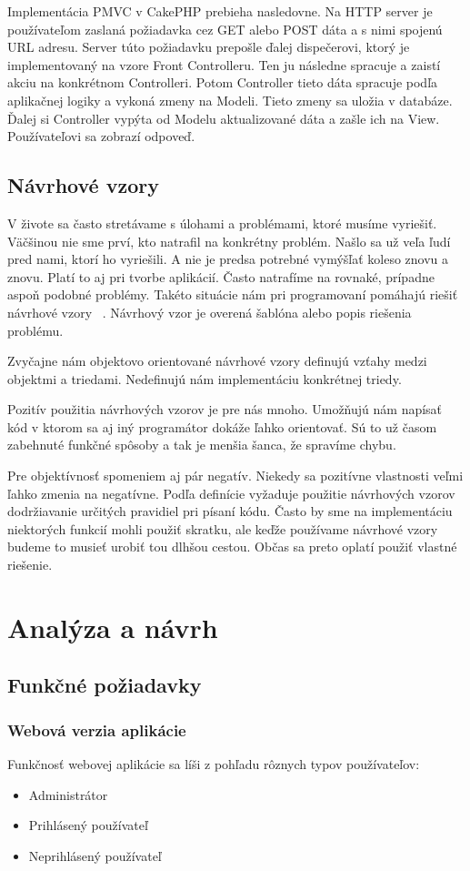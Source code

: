 \documentclass[12pt]{book}
\begin{document}
Implementácia PMVC v CakePHP prebieha nasledovne. Na HTTP server je používateľom zaslaná požiadavka cez GET alebo POST dáta a s nimi spojenú URL adresu. Server túto požiadavku prepošle ďalej dispečerovi, ktorý je implementovaný na vzore Front Controlleru. Ten ju následne spracuje a zaistí akciu na konkrétnom Controlleri. Potom Controller tieto dáta spracuje podľa aplikačnej logiky a vykoná zmeny na Modeli. Tieto zmeny sa uložia v databáze. Ďalej si Controller vypýta od Modelu aktualizované dáta a zašle ich na View. Používateľovi sa zobrazí odpoveď.
 

\section{Návrhové vzory}
V živote sa často stretávame s úlohami a problémami, ktoré musíme vyriešiť. Väčšinou nie sme prví, kto natrafil na konkrétny problém. Našlo sa už veľa ľudí pred nami, ktorí ho vyriešili. A nie je predsa potrebné vymýšľať koleso znovu a znovu. Platí to aj pri tvorbe aplikácií.  Často natrafíme na rovnaké, prípadne aspoň podobné problémy. Takéto situácie nám pri programovaní pomáhajú riešiť návrhové vzory \cite{NavrhoveVzory}\ . Návrhový vzor je overená šablóna alebo popis riešenia problému.

Zvyčajne nám objektovo orientované návrhové vzory definujú vzťahy medzi objektmi a triedami. Nedefinujú nám implementáciu konkrétnej triedy.  

Pozitív použitia návrhových vzorov je pre nás mnoho. Umožňujú nám napísať kód v ktorom sa aj iný programátor dokáže ľahko orientovať. Sú to už časom zabehnuté funkčné spôsoby a tak je menšia šanca, že spravíme chybu. 

Pre objektívnosť spomeniem aj pár negatív. Niekedy sa pozitívne vlastnosti veľmi ľahko zmenia na negatívne. Podľa definície vyžaduje použitie návrhových vzorov dodržiavanie určitých pravidiel pri písaní kódu. Často by sme na implementáciu niektorých funkcií mohli použiť skratku, ale keďže používame návrhové vzory budeme to musieť urobiť tou dlhšou cestou. Občas sa preto oplatí použiť vlastné riešenie.

\chapter{Analýza a návrh}
\section{Funkčné požiadavky}
\subsection{Webová verzia aplikácie}
Funkčnosť webovej aplikácie sa líši z pohľadu rôznych typov používateľov:
\begin{itemize}
\item{Administrátor}
\item{Prihlásený používateľ}
\item{Neprihlásený používateľ}
\end{itemize}
\end{document}

